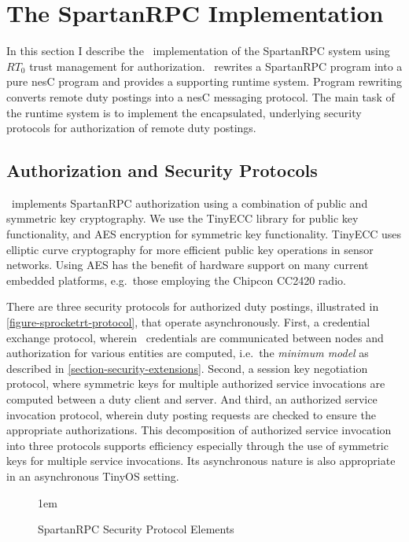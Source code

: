 \section{The SpartanRPC Implementation}
\label{section-implementation}

In this section I describe the \Sprocket\ implementation of the SpartanRPC system using $RT_0$
trust management for authorization. \Sprocket\ rewrites a SpartanRPC program into a pure nesC
program and provides a supporting runtime system. Program rewriting converts remote duty
postings into a nesC messaging protocol. The main task of the runtime system is to implement the
encapsulated, underlying security protocols for authorization of remote duty postings.

\subsection{Authorization and Security Protocols}
\label{section-security-protocols}
\label{section-underlying-protocols}

\Sprocket\ implements SpartanRPC authorization using a combination of public and symmetric key
cryptography. We use the TinyECC library \cite{Liu-Peng-TinyECC-2008} for public key
functionality, and AES encryption for symmetric key functionality. TinyECC uses elliptic curve
cryptography for more efficient public key operations in sensor networks. Using AES has the
benefit of hardware support on many current embedded platforms, e.g.~those employing the Chipcon
CC2420 radio.

There are three security protocols for authorized duty postings, illustrated in
\autoref{figure-sprocketrt-protocol}, that operate asynchronously. First, a credential exchange
protocol, wherein \RT\ credentials are communicated between nodes and authorization for various
entities are computed, i.e.~the \emph{minimum model} as described in
\autoref{section-security-extensions}. Second, a session key negotiation protocol, where
symmetric keys for multiple authorized service invocations are computed between a duty client
and server. And third, an authorized service invocation protocol, wherein duty posting requests
are checked to ensure the appropriate authorizations. This decomposition of authorized service
invocation into three protocols supports efficiency especially through the use of symmetric keys
for multiple service invocations. Its asynchronous nature is also appropriate in an asynchronous
TinyOS setting.

\begin{figure}[t]
  
  \centerline{\raise 1em\box\graph}
  \vspace{2mm}
  \caption{SpartanRPC Security Protocol Elements}
  \label{figure-sprocketrt-protocol}
\end{figure}

